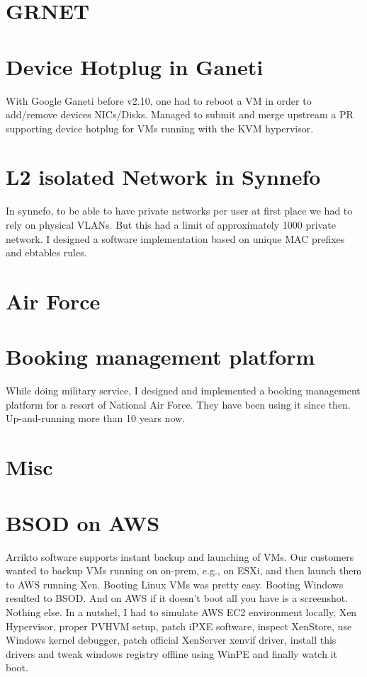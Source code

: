 \documentclass[margin,centered]{res}
\begin{document}
\begin{resume}
\section{GRNET}

\section{\sc Device Hotplug in Ganeti}
With Google Ganeti before v2.10, one had to reboot a VM in order to add/remove
devices NICs/Disks. Managed to submit and merge upstream a PR supporting
device hotplug for VMs running with the KVM hypervisor.

\section{\sc L2 isolated Network in Synnefo}
In synnefo, to be able to have private networks per user at first place we
had to rely on physical VLANs. But this had a limit of approximately 1000
private network. I designed a software implementation based on unique MAC
prefixes and ebtables rules.

\section{Air Force}

\section{\sc Booking management platform}
While doing military service, I designed and implemented a booking management
platform for a resort of National Air Force. They have been using it since then.
Up-and-running more than 10 years now.

\section{Misc}

\section{\sc BSOD on AWS}
Arrikto software supports instant backup and launching of VMs. Our customers
wanted to backup VMs running on on-prem, e.g., on ESXi, and then launch them to
AWS running Xen. Booting Linux VMs was pretty easy. Booting Windows resulted to
BSOD. And on AWS if it doesn't boot all you have is a screenshot. Nothing else.
In a nutshel, I had to simulate AWS EC2 environment locally, Xen Hypervisor,
proper PVHVM setup, patch iPXE software, inspect XenStore, use Windows kernel
debugger, patch official XenServer xenvif driver, install this drivers and
tweak windows registry offline using WinPE and finally watch it boot.


\end{resume}
\end{document}

